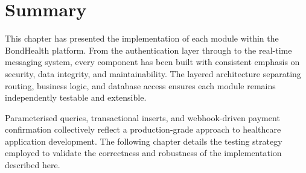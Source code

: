 \section{Summary}
\label{sec:implementation-summary}

\justifying
\noindent This chapter has presented the implementation of each module within the BondHealth platform. From the authentication layer through to the real-time messaging system, every component has been built with consistent emphasis on security, data integrity, and maintainability. The layered architecture separating routing, business logic, and database access ensures each module remains independently testable and extensible.

\justifying
\noindent Parameterised queries, transactional inserts, and webhook-driven payment confirmation collectively reflect a production-grade approach to healthcare application development. The following chapter details the testing strategy employed to validate the correctness and robustness of the implementation described here.
